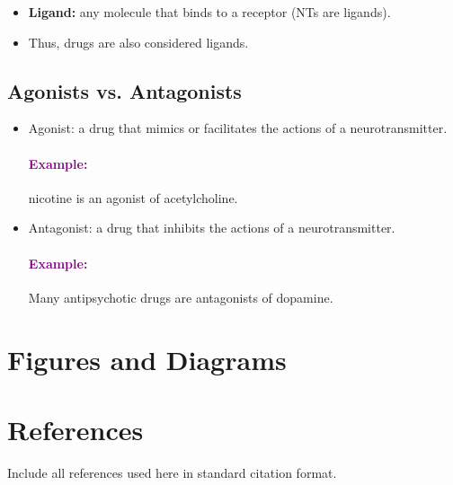 \documentclass[12pt,a4paper]{article}
\newcommand{\example}[1]{\paragraph{\textcolor{purple}{Example:}} #1}
\begin{document}
	\begin{itemize}
		\item \textbf{Ligand:} any molecule that binds to a receptor (NTs are ligands).
		\item Thus, drugs are also considered ligands. 
	\end{itemize}
	
	\subsection{Agonists vs. Antagonists}
	
	\begin{itemize}
		\item Agonist: a drug that mimics or facilitates the actions of a neurotransmitter. 
		\subitem \example{nicotine is an agonist of acetylcholine}. 
		\item Antagonist: a drug that inhibits the actions of a neurotransmitter. 
		\subitem \example{Many antipsychotic drugs are antagonists of dopamine}.
	\end{itemize}
	
	\section{Figures and Diagrams}
	
	
	
	\section{References}
	Include all references used here in standard citation format.
	
\end{document}
